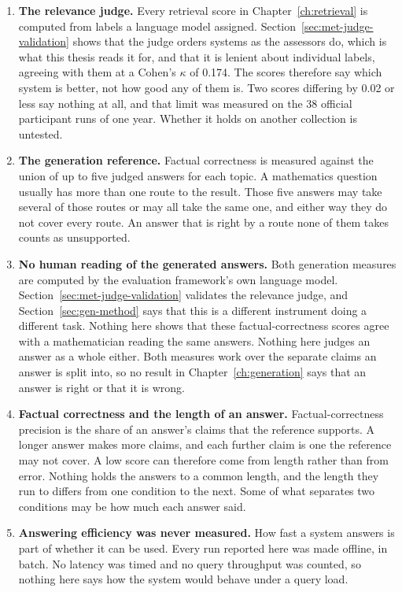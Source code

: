 \begin{enumerate}[leftmargin=1.7em,itemsep=0.7em,topsep=0.5em]

\item \textbf{The relevance judge.} Every retrieval score in Chapter~\ref{ch:retrieval} is computed
from labels a language model assigned. Section~\ref{sec:met-judge-validation} shows that the judge
orders systems as the assessors do, which is what this thesis reads it for, and that it is lenient
about individual labels, agreeing with them at a Cohen's $\kappa$ of 0.174. The scores therefore say
which system is better, not how good any of them is. Two scores differing by 0.02 or less say nothing
at all, and that limit was measured on the 38 official participant runs of one year. Whether it holds
on another collection is untested.

\item \textbf{The generation reference.} Factual correctness is measured against the union of up to
five judged answers for each topic. A mathematics question usually has more than one route to the
result. Those five answers may take several of those routes or may all take the same one, and either
way they do not cover every route. An answer that is right by a route none of them takes counts as
unsupported.

\item \textbf{No human reading of the generated answers.} Both generation measures are computed by
the evaluation framework's own language model. Section~\ref{sec:met-judge-validation} validates the
relevance judge, and Section~\ref{sec:gen-method} says that this is a different instrument doing a
different task. Nothing here shows that these factual-correctness scores agree with a mathematician
reading the same answers. Nothing here judges an answer as a whole either. Both measures work over
the separate claims an answer is split into, so no result in Chapter~\ref{ch:generation} says that an
answer is right or that it is wrong.

\item \textbf{Factual correctness and the length of an answer.} Factual-correctness precision is the
share of an answer's claims that the reference supports. A longer answer makes more claims, and each
further claim is one the reference may not cover. A low score can therefore come from length rather
than from error. Nothing holds the answers to a common length, and the length they run to differs from
one condition to the next. Some of what separates two conditions may be how much each answer said.

\item \textbf{Answering efficiency was never measured.} How fast a system answers is part of whether
it can be used. Every run reported here was made offline, in batch. No latency was timed and no query
throughput was counted, so nothing here says how the system would behave under a query load.

\end{enumerate}

